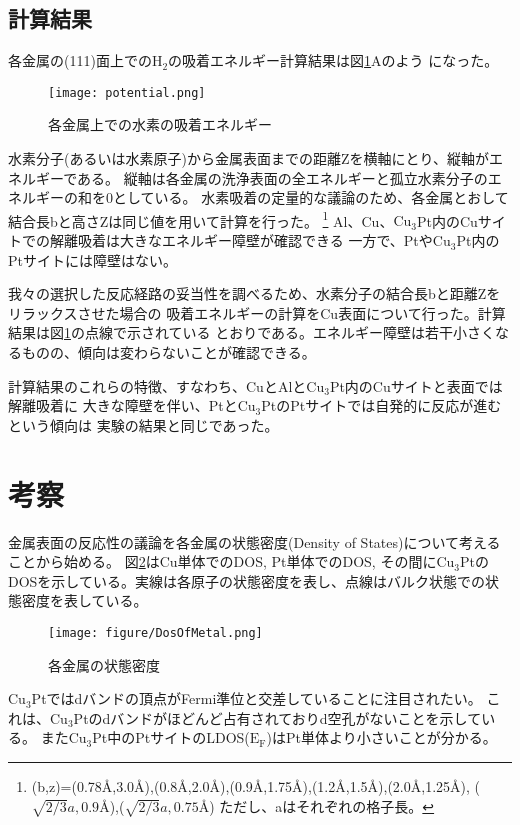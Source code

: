 \documentclass[12pt]{ltjsarticle}
\begin{document}
\subsection{計算結果}
各金属の(111)面上での$\text{H}_\text{2}$の吸着エネルギー計算結果は図\ref{fig:potential}Aのよう
になった。\\
\begin{figure}[hbtp]
    \begin{center}
     \texttt{[image: potential.png]}
    \end{center}
    \caption{各金属上での水素の吸着エネルギー}
    \label{fig:potential}
\end{figure}
水素分子(あるいは水素原子)から金属表面までの距離Zを横軸にとり、縦軸がエネルギーである。
縦軸は各金属の洗浄表面の全エネルギーと孤立水素分子のエネルギーの和を0としている。
水素吸着の定量的な議論のため、各金属とおして結合長bと高さZは同じ値を用いて計算を行った。
\footnote{(b,z)=(0.78$\mbox{\AA}$,3.0$\mbox{\AA}$),(0.8$\mbox{\AA}$,2.0$\mbox{\AA}$),(0.9$\mbox{\AA}$,1.75$\mbox{\AA}$),(1.2$\mbox{\AA}$,1.5$\mbox{\AA}$),(2.0$\mbox{\AA}$,1.25$\mbox{\AA}$),
($\sqrt{2/3}a,0.9\mbox{\AA}$),($\sqrt{2/3}a,0.75\mbox{\AA}$) ただし、aはそれぞれの格子長。}
Al、Cu、$\text{Cu}_\text{3}$Pt内のCuサイトでの解離吸着は大きなエネルギー障壁が確認できる
一方で、Ptや$\text{Cu}_\text{3}$Pt内のPtサイトには障壁はない。

我々の選択した反応経路の妥当性を調べるため、水素分子の結合長bと距離Zをリラックスさせた場合の
吸着エネルギーの計算をCu表面について行った。計算結果は図\ref{fig:potential}の点線で示されている
とおりである。エネルギー障壁は若干小さくなるものの、傾向は変わらないことが確認できる。

計算結果のこれらの特徴、すなわち、CuとAlと$\text{Cu}_\text{3}$Pt内のCuサイトと表面では解離吸着に
大きな障壁を伴い、Ptと$\text{Cu}_\text{3}$PtのPtサイトでは自発的に反応が進むという傾向は
実験の結果と同じであった。

\section{考察}

金属表面の反応性の議論を各金属の状態密度(Density of States)について考えることから始める。
図\ref{fig:dosmetal}はCu単体でのDOS, Pt単体でのDOS, その間に$\text{Cu}_\text{3}$Ptの
DOSを示している。実線は各原子の状態密度を表し、点線はバルク状態での状態密度を表している。
\begin{figure}[hbtp]
    \begin{center}
     \texttt{[image: figure/DosOfMetal.png]}
    \end{center}
    \caption{各金属の状態密度}
    \label{fig:dosmetal}
\end{figure}
$\text{Cu}_\text{3}$Ptではdバンドの頂点がFermi準位と交差していることに注目されたい。
これは、$\text{Cu}_\text{3}$Ptのdバンドがほどんど占有されておりd空孔がないことを示している。
また$\text{Cu}_\text{3}$Pt中のPtサイトのLDOS($\text{E}_\text{F}$)はPt単体より小さいことが分かる。
\end{document}
